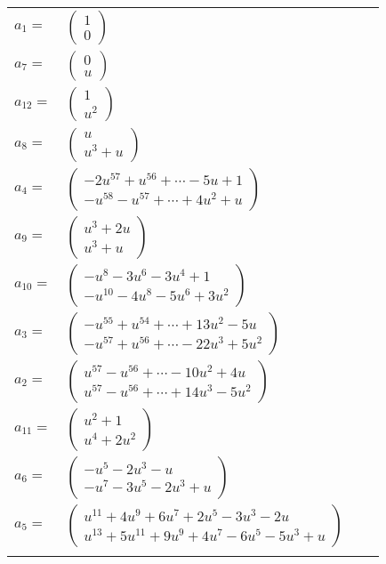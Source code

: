 \documentclass[1p]{elsarticle_modified}
\theoremstyle{definition}
\begin{document}
\begin{tabular}{m{7pt} m{180pt} m{7pt} m{180pt} }
\flushright $a_{1}=$&$\begin{pmatrix}1\\0\end{pmatrix}$ \\
\flushright $a_{7}=$&$\begin{pmatrix}0\\u\end{pmatrix}$ \\
\flushright $a_{12}=$&$\begin{pmatrix}1\\u^2\end{pmatrix}$ \\
\flushright $a_{8}=$&$\begin{pmatrix}u\\u^3+u\end{pmatrix}$ \\
\flushright $a_{4}=$&$\begin{pmatrix}-2 u^{57}+u^{56}+\cdots-5 u+1\\- u^{58}- u^{57}+\cdots+4 u^2+u\end{pmatrix}$ \\
\flushright $a_{9}=$&$\begin{pmatrix}u^3+2 u\\u^3+u\end{pmatrix}$ \\
\flushright $a_{10}=$&$\begin{pmatrix}- u^8-3 u^6-3 u^4+1\\- u^{10}-4 u^8-5 u^6+3 u^2\end{pmatrix}$ \\
\flushright $a_{3}=$&$\begin{pmatrix}- u^{55}+u^{54}+\cdots+13 u^2-5 u\\- u^{57}+u^{56}+\cdots-22 u^3+5 u^2\end{pmatrix}$ \\
\flushright $a_{2}=$&$\begin{pmatrix}u^{57}- u^{56}+\cdots-10 u^2+4 u\\u^{57}- u^{56}+\cdots+14 u^3-5 u^2\end{pmatrix}$ \\
\flushright $a_{11}=$&$\begin{pmatrix}u^2+1\\u^4+2 u^2\end{pmatrix}$ \\
\flushright $a_{6}=$&$\begin{pmatrix}- u^5-2 u^3- u\\- u^7-3 u^5-2 u^3+u\end{pmatrix}$ \\
\flushright $a_{5}=$&$\begin{pmatrix}u^{11}+4 u^9+6 u^7+2 u^5-3 u^3-2 u\\u^{13}+5 u^{11}+9 u^9+4 u^7-6 u^5-5 u^3+u\end{pmatrix}$\\&\end{tabular}
\end{document}
